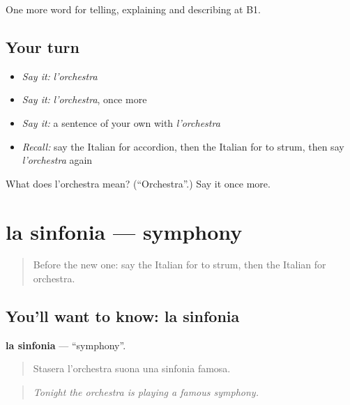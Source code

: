 \begin{grammarlens}[title={What you've built}]
One more word for telling, explaining and describing at B1.
\end{grammarlens}

\subsection*{Your turn}
\begin{itemize}
\raggedright
  \item \emph{Say it:} \emph{l'orchestra}
  \item \emph{Say it:} \emph{l'orchestra}, once more
  \item \emph{Say it:} a sentence of your own with \emph{l'orchestra}
  \item \emph{Recall:} say the Italian for accordion, then the Italian for to strum, then say \emph{l'orchestra} again
\end{itemize}

\begin{tcolorbox}[breakable,colback=teal!4,colframe=teal!35!black,title={Before you move on}]
What does l'orchestra mean? (\textquotedblleft{}Orchestra\textquotedblright{}.) Say it once more.
\end{tcolorbox}
\section[la sinfonia]{la sinfonia — symphony}

\label{lesson:IT-C517-sinfonia}



\begin{quote}
Before the new one: say the Italian for to strum, then the Italian for orchestra.
\end{quote}

\subsection*{You'll want to know: la sinfonia}
\textbf{la sinfonia} — \textquotedblleft{}symphony\textquotedblright{}.

\begin{quote}
Stasera l'orchestra suona una sinfonia famosa.
\end{quote}

\begin{quote}
\emph{Tonight the orchestra is playing a famous symphony.}
\end{quote}

